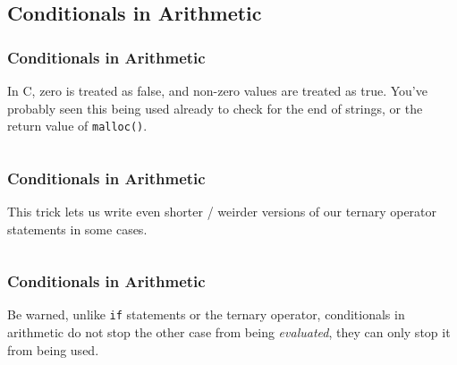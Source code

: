 \documentclass[handout,xcolor]{beamer}
\begin{document}
\subsection{Conditionals in Arithmetic}

\begin{frame}
	\frametitle{Conditionals in Arithmetic}
	\pause
	
	In C, zero is treated as false, and non-zero values are treated as true. You've probably seen this being used already to check for the end of strings, or the return value of \texttt{malloc()}.
	\pause
	
	\begin{columns}
		\begin{column}{0.45\textwidth}
			\centering
			
		\end{column}
		\pause
		\begin{column}{0.45\textwidth}
			\centering
			
		\end{column}
	\end{columns}
\end{frame}

\begin{frame}
	\frametitle{Conditionals in Arithmetic}
	\pause
	
	This trick lets us write even shorter / weirder versions of our ternary operator statements in some cases.
	\pause
	
	\begin{columns}
		\begin{column}{0.45\textwidth}
			\centering
			
		\end{column}
		\pause
		\begin{column}{0.45\textwidth}
			\centering
			
		\end{column}
	\end{columns}
\end{frame}

\begin{frame}
	\frametitle{Conditionals in Arithmetic}
	\pause
	
	Be warned, unlike \texttt{if} statements or the ternary operator, conditionals in arithmetic do not stop the other case from being \textit{evaluated}, they can only stop it from being used.
	\pause
	
	
\end{frame}
\end{document}
